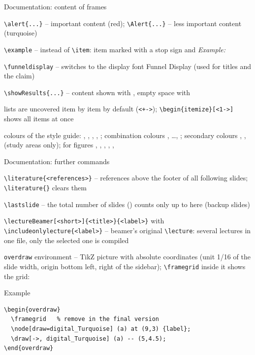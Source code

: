 %
\begin{frame}[fragile]{Documentation: content of frames}
	\scriptsize
	\begin{doclist}
		\item \verb|\alert{...}| -- important content (red); \verb|\Alert{...}| -- less important content (turquoise)
		\item \verb|\example| -- instead of \verb|\item|: item marked with a stop sign and \emph{Example:}
		\item \verb|\funneldisplay| -- switches to the display font Funnel Display (used for titles and the claim)
		\item \verb|\showResults{...}| -- content shown with , empty space with 
		\item lists are uncovered item by item by default (\verb|<+->|); \verb|\begin{itemize}[<1->]| shows all items at once
		\item colours of the style guide: , , , , ; combination colours , \dots, ; secondary colours , ,  (study areas only); for figures , , , , , 
	\end{doclist}
\end{frame}
%
\begin{frame}[fragile]{Documentation: further commands}
	\scriptsize
	\begin{doclist}
		\item \verb|\literature{<references>}| -- references above the footer of all following slides; \verb|\literature{}| clears them
		\item \verb|\lastslide| -- the total number of slides () counts only up to here (backup slides)
		\item \verb|\lectureBeamer[<short>]{<title>}{<label>}| with \verb|\includeonlylecture{<label>}| -- beamer's original \verb|\lecture|: several lectures in one file, only the selected one is compiled
		\item \verb|overdraw| environment -- TikZ picture with absolute coordinates (unit 1/16 of the slide width, origin bottom left, right of the sidebar); \verb|\framegrid| inside it shows the grid:
	\end{doclist}
	\medskip
	\begin{exampleblock}{Example}
\begin{verbatim}
\begin{overdraw}
  \framegrid   % remove in the final version
  \node[draw=digital_Turquoise] (a) at (9,3) {label};
  \draw[->, digital_Turquoise] (a) -- (5,4.5);
\end{overdraw}
\end{verbatim}
	\end{exampleblock}
\end{frame}
